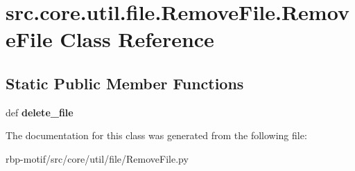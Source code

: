 \hypertarget{classsrc_1_1core_1_1util_1_1file_1_1RemoveFile_1_1RemoveFile}{\section{src.\-core.\-util.\-file.\-Remove\-File.\-Remove\-File Class Reference}
\label{classsrc_1_1core_1_1util_1_1file_1_1RemoveFile_1_1RemoveFile}
}
\subsection*{Static Public Member Functions}
\begin{DoxyCompactItemize}
\item 
\hypertarget{classsrc_1_1core_1_1util_1_1file_1_1RemoveFile_1_1RemoveFile_afb631c4bc25656b29a2cf94d7dfc98a7}{def {\bfseries delete\-\_\-file}}\label{classsrc_1_1core_1_1util_1_1file_1_1RemoveFile_1_1RemoveFile_afb631c4bc25656b29a2cf94d7dfc98a7}

\end{DoxyCompactItemize}


The documentation for this class was generated from the following file\-:\begin{DoxyCompactItemize}
\item 
rbp-\/motif/src/core/util/file/Remove\-File.\-py\end{DoxyCompactItemize}
